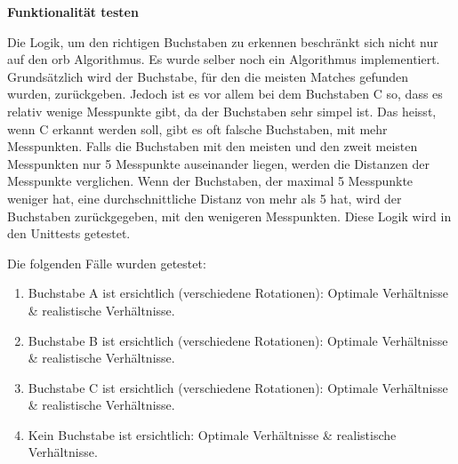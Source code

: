 \textbf{Funktionalität testen}

Die Logik, um den richtigen Buchstaben zu erkennen beschränkt sich nicht nur auf den \acrshort{orb} Algorithmus. Es wurde selber noch ein Algorithmus implementiert. Grundsätzlich wird der Buchstabe, für den die meisten Matches gefunden wurden, zurückgeben. Jedoch ist es vor allem bei dem Buchstaben C so, dass es relativ wenige Messpunkte gibt, da der Buchstaben sehr simpel ist. Das heisst, wenn C erkannt werden soll, gibt es oft falsche Buchstaben, mit mehr Messpunkten. Falls die Buchstaben mit den meisten und den zweit meisten Messpunkten nur 5 Messpunkte auseinander liegen, werden die Distanzen der Messpunkte verglichen. Wenn der Buchstaben, der maximal 5 Messpunkte weniger hat, eine durchschnittliche Distanz von mehr als 5 hat, wird der Buchstaben zurückgegeben, mit den wenigeren Messpunkten. Diese Logik wird in den Unittests getestet.

Die folgenden Fälle wurden getestet:

\begin{enumerate}
    \item Buchstabe A ist ersichtlich (verschiedene Rotationen): Optimale Verhältnisse \& realistische Verhältnisse.
    \item Buchstabe B ist ersichtlich (verschiedene Rotationen): Optimale Verhältnisse \& realistische Verhältnisse.
    \item Buchstabe C ist ersichtlich (verschiedene Rotationen): Optimale Verhältnisse \& realistische Verhältnisse.
    \item Kein Buchstabe ist ersichtlich: Optimale Verhältnisse \& realistische Verhältnisse.
\end{enumerate}

